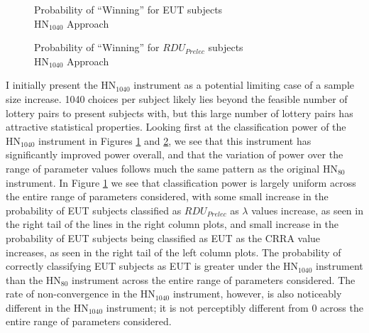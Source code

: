 \documentclass[../main.tex]{subfiles}
\begin{document}
\begin{figure}[h!]
	\center
	\caption{Probability of \enquote{Winning} for EUT subjects\\$\text{HN}_{1040}$ Approach}
	\label{fig:HN_win_eut}
\end{figure}

\begin{figure}[h!]
	\center
	\caption{Probability of \enquote{Winning} for $\mathit{RDU_{Prelec}}$ subjects\\$\text{HN}_{1040}$ Approach}
	\label{fig:HN_win_pre}
\end{figure}

I initially present the $\text{HN}_{1040}$ instrument as a potential limiting case of a sample size increase.
1040 choices per subject likely lies beyond the feasible number of lottery pairs to present subjects with, but this large number of lottery pairs has attractive statistical properties.
Looking first at the classification power of the $\text{HN}_{1040}$ instrument in Figures \ref{fig:HN_win_eut} and \ref{fig:HN_win_pre}, we see that this instrument has significantly improved power overall, and that the variation of power over the range of parameter values follows much the same pattern as the original $\text{HN}_{80}$ instrument.
In Figure \ref{fig:HN_win_eut} we see that classification power is largely uniform across the entire range of parameters considered, with some small increase in the probability of EUT subjects classified as $\mathit{RDU_{Prelec}}$ as $\lambda$ values increase, as seen in the right tail of the lines in the right column plots, and small increase in the probability of EUT subjects being classified as EUT as the CRRA value increases, as seen in the right tail of the left column plots.
The probability of correctly classifying EUT subjects as EUT is greater under the $\text{HN}_{1040}$ instrument than the $\text{HN}_{80}$ instrument across the entire range of parameters considered.
The rate of non-convergence in the $\text{HN}_{1040}$ instrument, however, is also noticeably different in the $\text{HN}_{1040}$ instrument; it is not perceptibly different from 0 across the entire range of parameters considered.
\end{document}
